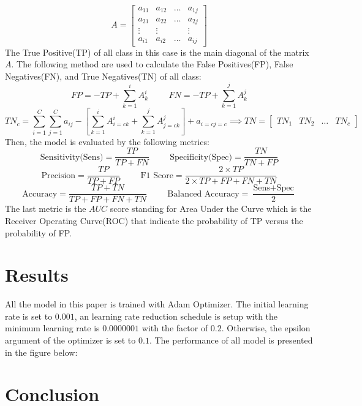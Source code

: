 \[
	A = \begin{bmatrix}
		a_{11} & a_{12} & \dots & a_{1j} \\
		a_{21} & a_{22} & \dots & a_{2j} \\
		\vdots & \vdots	&  & \vdots\\
		a_{i1} & a_{i2} & \dots & a_{ij} 
	\end{bmatrix}
\]
The True Positive(TP) of all class in this case is the main diagonal of the matrix $A$. The following method are used to calculate the False Positives(FP), False Negatives(FN), and True Negatives(TN) of all class:
\[
	FP = -TP + \sum_{k=1}^{i}A^i_k \hspace{1cm} FN = -TP + \sum_{k=1}^{j}A^j_k
\]
\[
	TN_c = \sum_{i=1}^{C}\sum_{j=1}^{C}a_{ij} - \left[ \sum_{k=1}^{i}A^i_{i=c k} + \sum_{k=1}^{j}A^j_{j=c k} \right] + a_{i=c j=c} \implies TN = \begin{bmatrix}
		TN_1 & TN_2 & \dots & TN_c
	\end{bmatrix}
\]
Then, the model is evaluated by the following metrics:
\[\text{Sensitivity(Sens)} = \frac{TP}{TP + FN} \hspace{1cm} \text{Specificity(Spec)} = \frac{TN}{TN + FP}\]
\[\text{Precision} = \frac{TP}{TP + FP} \hspace{1cm} \text{F1 Score} = \frac{2 \times TP}{2 \times TP + FP + FN + TN}\]
\[\text{Accuracy} = \frac{TP + TN}{TP + FP + FN + TN} \hspace{1cm} \text{Balanced Accuracy} = \frac{\text{Sens} + \text{Spec}}{2}\]
The last metric is the $AUC$ score standing for Area Under the Curve which is the Receiver Operating Curve(ROC) that indicate the probability of TP versus the probability of FP.  
\section{Results}
All the model in this paper is trained with Adam Optimizer\cite{6980}. The initial learning rate is set to $0.001$, an learning rate reduction schedule is setup with the minimum learning rate is $0.0000001$ with the factor of $0.2$. Otherwise, the epsilon argument of the optimizer is set to $0.1$. The performance of all model is presented in the figure below:
\section{Conclusion}
\cite{08332}
\clearpage
\pagebreak

